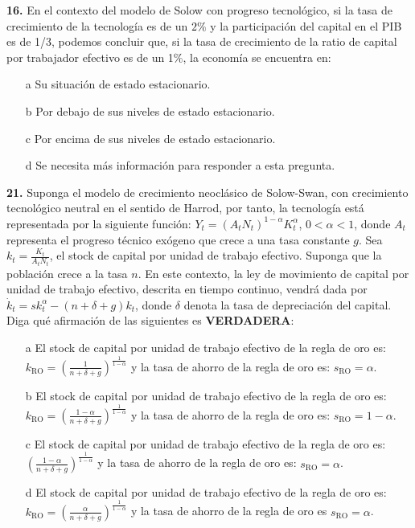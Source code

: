 \documentclass{nuevotema}
\begin{document}
\textbf{16.} En el contexto del modelo de Solow con progreso tecnológico, si la tasa de crecimiento de la tecnología es de un $2\%$ y la participación del capital en el PIB es de 1/3, podemos concluir que, si la tasa de crecimiento de la ratio de capital por trabajador efectivo es de un 1\%, la economía se encuentra en:

\begin{itemize}
	\item[a] Su situación de estado estacionario.
	\item[b] Por debajo de sus niveles de estado estacionario.
	\item[c] Por encima de sus niveles de estado estacionario.
	\item[d] Se necesita más información para responder a esta pregunta.
\end{itemize}


\textbf{21.} Suponga el modelo de crecimiento neoclásico de Solow-Swan, con crecimiento tecnológico neutral en el sentido de Harrod, por tanto, la tecnología está representada por la siguiente función: $Y_t = (A_t N_t)^{1-\alpha} K_t^\alpha$, $0 < \alpha < 1$, donde $A_t$ representa el progreso técnico exógeno que crece a una tasa constante $g$. Sea $k_t = \frac{K_t}{A_t N_t}$, el stock de capital por unidad de trabajo efectivo. Suponga que la población crece a la tasa $n$. En este contexto, la ley de movimiento de capital por unidad de trabajo efectivo, descrita en tiempo continuo, vendrá dada por $\dot{k}_t = s k_t^\alpha - (n+\delta+g) k_t$, donde $\delta$ denota la tasa de depreciación del capital. Diga qué afirmación de las siguientes es \textbf{VERDADERA}:

\begin{itemize}
	\item[a] El stock de capital por unidad de trabajo  efectivo de la regla de oro es: $k_\text{RO} = \left( \frac{1}{n+\delta+g} \right)^\frac{1}{1-\alpha}$ y la tasa de ahorro de la regla de oro es: $s_\text{RO} = \alpha$.
	\item[b] El stock de capital por unidad de trabajo efectivo de la regla de oro es: $k_\text{RO} = \left( \frac{1-\alpha}{n+\delta+g} \right)^\frac{1}{1-\alpha}$  y la tasa de ahorro de la regla de oro es: $s_\text{RO} = 1-\alpha$.
	\item[c] El stock de capital por unidad de trabajo efectivo de la regla de oro es: $\left(  \frac{1-\alpha}{n+\delta+g} \right)^\frac{1}{1-\alpha}$ y la tasa de ahorro de la regla de oro es: $s_\text{RO} = \alpha$.
	\item[d] El stock de capital por unidad de trabajo efectivo de la regla de oro es: $k_\text{RO} = \left( \frac{\alpha}{n+\delta+g} \right)^\frac{1}{1-\alpha} $ y la tasa de ahorro de la regla de oro es $s_\text{RO} = \alpha$.
\end{itemize}
\end{document}
